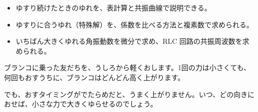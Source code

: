 \newcommand\bkvinspring[2]{\draw[bkInk, line width=0.8pt, decorate, decoration={zigzag, segment length=2.2mm, amplitude=1.7mm, pre length=2.5mm, post length=2.5mm}] #1 -- #2;}
\newcommand\bkvindamper[2]{\begin{scope}[shift={#1}]
  \fill[bkYellow!30] (2.5,-2.6) rectangle ({0.66*#2},2.6);
  \draw[bkInk, line width=0.8pt] (0,0) -- (2.5,0) (2.5,-2.6) -- (2.5,2.6) (2.5,2.6) -- ({0.66*#2},2.6) (2.5,-2.6) -- ({0.66*#2},-2.6);
  \draw[bkInk, line width=1.3pt] ({0.42*#2},-2) -- ({0.42*#2},2);
  \draw[bkInk, line width=0.8pt] ({0.42*#2},0) -- (#2,0);
\end{scope}}
\makeatother


\begin{goal}
\begin{itemize}[label={\color{\bkTT}●}, leftmargin=1.6\zw, itemsep=0pt, topsep=1pt]
\item {}\enspace ゆすり続けたときのゆれを、表計算と共振曲線で説明できる。
\item {}\enspace ゆすりに合うゆれ（特殊解）を、係数を比べる方法と複素数で求められる。
\item {}\enspace いちばん大きくゆれる角振動数を微分で求め、RLC 回路の共振周波数を求められる。
\end{itemize}
\end{goal}

\begin{hatena}
\noindent\begin{minipage}[c]{0.6\linewidth}
\raggedright
ブランコに乗った友だちを、うしろから軽くおします。1回の力は小さくても、何回もおすうちに、ブランコはどんどん高く上がります。\par\vspace{4pt}
でも、おすタイミングがでたらめだと、うまく上がりません。いつ、どの向きにおせば、小さな力で大きくゆらせるのでしょう。
\end{minipage}\hfill
\begin{minipage}[c]{0.36\linewidth}
\centering
{}
\end{minipage}
\end{hatena}

